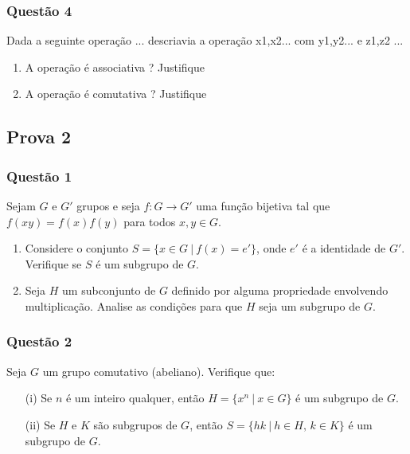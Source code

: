         \subsubsection*{Questão 4}
            
            Dada a seguinte operação ... descriavia a operação x1,x2... com y1,y2... e z1,z2 ...    

            \begin{enumerate}[label=\alph*), left=0.5cm, align=left, nosep]
                \item A operação é associativa ? Justifique  
                \item A operação é comutativa ? Justifique
            \end{enumerate}

    \subsection{Prova 2}
        \subsubsection*{Questão 1}

        Sejam $G$ e $G'$ grupos e seja $f: G \to G'$ uma função bijetiva tal que $f(xy) = f(x)f(y)$ para todos $x, y \in G$.

        \begin{enumerate}[label=\alph*), left=0.5cm, align=left, nosep]
            \item Considere o conjunto $S = \{ x \in G\ |\ f(x) = e' \}$, onde $e'$ é a identidade de $G'$. Verifique se $S$ é um subgrupo de $G$.
            \item Seja $H$ um subconjunto de $G$ definido por alguma propriedade envolvendo multiplicação. Analise as condições para que $H$ seja um subgrupo de $G$.
        \end{enumerate}

        \subsubsection*{Questão 2}

        Seja $G$ um grupo comutativo (abeliano). Verifique que:
        \begin{enumerate}
            \item [(i)] Se $n$ é um inteiro qualquer, então $H = \{ x^n\ |\ x \in G \}$ é um subgrupo de $G$.
            \item [(ii)] Se $H$ e $K$ são subgrupos de $G$, então $S = \{ hk\ |\ h \in H,\, k \in K \}$ é um subgrupo de $G$.
        \end{enumerate}

